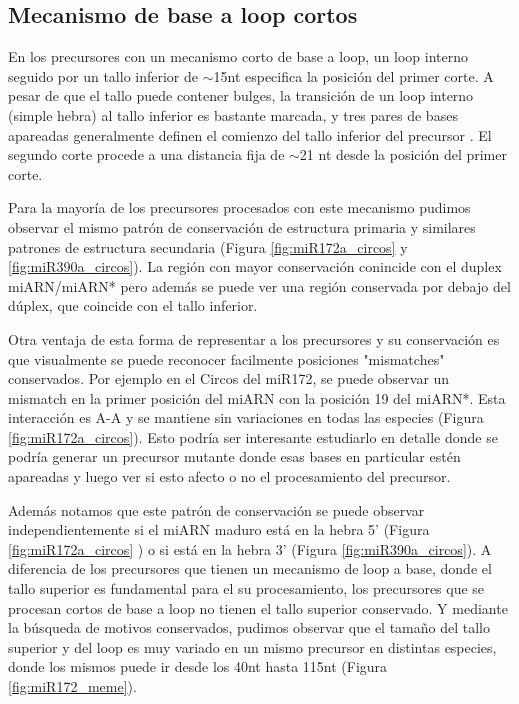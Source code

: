\subsection{Mecanismo de base a loop cortos}

En los precursores con un mecanismo corto de base a loop, un loop interno seguido por un tallo inferior de $\sim$15nt especifica la posición del primer corte.
A pesar de que el tallo puede contener bulges, la transición de un loop interno (simple hebra) al tallo inferior es bastante marcada, y tres pares de bases apareadas generalmente definen el comienzo del tallo inferior del precursor \citep{Mateos2010,Bologna2013}.
El segundo corte procede a una distancia fija de $\sim$21 nt desde la posición del primer corte.

Para la mayoría de los precursores procesados con este mecanismo pudimos observar el mismo patrón de conservación de estructura primaria y similares patrones de estructura secundaria (Figura \ref{fig:miR172a_circos} y \ref{fig:miR390a_circos}). 
La región con mayor conservación conincide con el duplex miARN/miARN* pero además se puede ver una región  conservada por debajo del dúplex, que coincide con el tallo inferior.

Otra ventaja de esta forma de representar a los precursores y su conservación es que visualmente se puede reconocer facilmente posiciones "mismatches" conservados. 
Por ejemplo en el Circos del miR172, se puede observar un mismatch en la primer posición del miARN con la posición 19 del miARN*.
Esta interacción es A-A y se mantiene sin variaciones en todas las especies (Figura \ref{fig:miR172a_circos}).
Esto podría ser interesante estudiarlo en detalle donde se podría generar un precursor mutante donde esas bases en particular estén apareadas y luego ver si esto afecto o no el procesamiento del precursor.  

Además notamos que este patrón de conservación se puede observar independientemente si el miARN maduro está en la hebra 5' (Figura \ref{fig:miR172a_circos} ) o si está en la hebra 3' (Figura \ref{fig:miR390a_circos}).
A diferencia de los precursores que tienen un mecanismo de loop a base, donde el tallo superior es fundamental para el su procesamiento, los precursores que se procesan cortos de base a loop no tienen el tallo superior conservado.
Y mediante la búsqueda de motivos conservados, pudimos observar que el tamaño del tallo superior y del loop es muy variado en un mismo precursor en distintas especies, donde los mismos puede ir desde los 40nt hasta 115nt (Figura \ref{fig:miR172_meme}).



